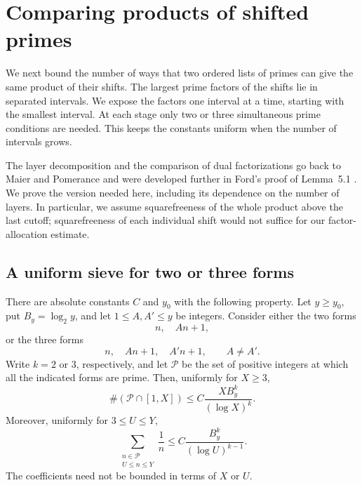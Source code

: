 \section{Comparing products of shifted primes}\label{sec:layers}

We next bound the number of ways that two ordered lists of primes can
give the same product of their shifts.  The largest prime factors of the
shifts lie in separated intervals.  We expose the factors one interval
at a time, starting with the smallest interval.  At each stage only two
or three simultaneous prime conditions are needed.  This keeps the
constants uniform when the number of intervals grows.

The layer decomposition and the comparison of dual factorizations
go back to Maier and Pomerance \cite[Section~3]{MaierPomerance1988}
and were developed further in Ford's proof of Lemma~5.1
\cite{FordTotients2013}. We prove the version needed here,
including its dependence on the number of layers.  In particular, we
assume squarefreeness of the whole product above the last cutoff;
squarefreeness of each individual shift would not suffice for our
factor-allocation estimate.

\subsection{A uniform sieve for two or three forms}

\begin{lemma}\label{lem:sieve}
There are absolute constants $C$ and $y_0$ with the following property.
Let $y\ge y_0$, put $B_y=\log_2 y$, and let $1\le A,A'\le y$ be
integers.  Consider either the two forms
\[
 n,\quad An+1,
\]
or the three forms
\[
 n,\quad An+1,\quad A'n+1,\qquad A\ne A'.
\]
Write $k=2$ or $3$, respectively, and let $\mathcal P$ be the set of
positive integers at which all the indicated forms are prime.  Then,
uniformly for $X\ge3$,
\begin{equation}\label{eq:sieve-count}
 \#(\mathcal P\cap[1,X])
 \le C\frac{X B_y^k}{(\log X)^k}.
\end{equation}
Moreover, uniformly for $3\le U\le Y$,
\begin{equation}\label{eq:sieve-reciprocal}
 \sum_{\substack{n\in\mathcal P\\U\le n\le Y}}\frac1n
 \le C\frac{B_y^k}{(\log U)^{k-1}}.
\end{equation}
The coefficients need not be bounded in terms of $X$ or $U$.
\end{lemma}

